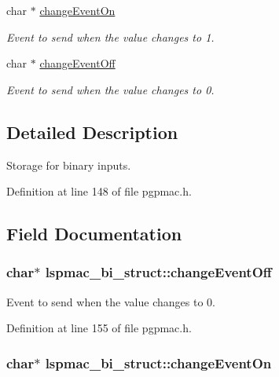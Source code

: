 \begin{DoxyCompactItemize}
char $\ast$ \hyperlink{structlspmac__bi__struct_ae7178007dfdf21be0e5b1fbaa36732af}{change\-Event\-On}
\begin{DoxyCompactList}\small\item\em Event to send when the value changes to 1. \end{DoxyCompactList}\item 
char $\ast$ \hyperlink{structlspmac__bi__struct_ae0859842f637694ace0e6d54c0e2af6a}{change\-Event\-Off}
\begin{DoxyCompactList}\small\item\em Event to send when the value changes to 0. \end{DoxyCompactList}\end{DoxyCompactItemize}


\subsection{Detailed Description}
Storage for binary inputs. 

Definition at line 148 of file pgpmac.\-h.



\subsection{Field Documentation}
\hypertarget{structlspmac__bi__struct_ae0859842f637694ace0e6d54c0e2af6a}{
\subsubsection[{change\-Event\-Off}]{\setlength{\rightskip}{0pt plus 5cm}char$\ast$ lspmac\-\_\-bi\-\_\-struct\-::change\-Event\-Off}}\label{structlspmac__bi__struct_ae0859842f637694ace0e6d54c0e2af6a}


Event to send when the value changes to 0. 



Definition at line 155 of file pgpmac.\-h.

\hypertarget{structlspmac__bi__struct_ae7178007dfdf21be0e5b1fbaa36732af}{
\subsubsection[{change\-Event\-On}]{\setlength{\rightskip}{0pt plus 5cm}char$\ast$ lspmac\-\_\-bi\-\_\-struct\-::change\-Event\-On}}\label{structlspmac__bi__struct_ae7178007dfdf21be0e5b1fbaa36732af}


